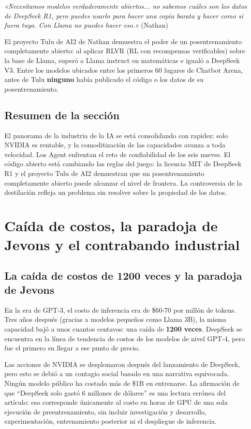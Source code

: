 \documentclass[a4paper]{article}
\begin{document}
\textit{«Necesitamos modelos verdaderamente abiertos... no sabemos cuáles son los datos de DeepSeek R1, pero puedes usarlo para hacer una copia barata y hacer como si fuera tuya. Con Llama no puedes hacer eso.»} (Nathan)

El proyecto Tulu de AI2 de Nathan demuestra el poder de un posentrenamiento completamente abierto: al aplicar RLVR (RL con recompensas verificables) sobre la base de Llama, superó a Llama instruct en matemáticas e igualó a DeepSeek V3. Entre los modelos ubicados entre los primeros 60 lugares de Chatbot Arena, antes de Tulu \textbf{ninguno} había publicado el código o los datos de su posentrenamiento.

\subsection{Resumen de la sección}

El panorama de la industria de la IA se está consolidando con rapidez: solo NVIDIA es rentable, y la comoditización de las capacidades avanza a toda velocidad. Los Agent enfrentan el reto de confiabilidad de los seis nueves. El código abierto está cambiando las reglas del juego: la licencia MIT de DeepSeek R1 y el proyecto Tulu de AI2 demuestran que un posentrenamiento completamente abierto puede alcanzar el nivel de frontera. La controversia de la destilación refleja un problema sin resolver sobre la propiedad de los datos.
\section{Caída de costos, la paradoja de Jevons y el contrabando industrial}

\subsection{La caída de costos de 1200 veces y la paradoja de Jevons}

En la era de GPT-3, el costo de inferencia era de \$60-70 por millón de tokens. Tres años después (gracias a modelos pequeños como Llama 3B), la misma capacidad bajó a unos cuantos centavos: una caída de \textbf{1200 veces}. DeepSeek se encuentra en la línea de tendencia de costos de los modelos de nivel GPT-4, pero fue el primero en llegar a ese punto de precio.

Las acciones de NVIDIA se desplomaron después del lanzamiento de DeepSeek, pero esto se debió a un contagio social basado en una narrativa equivocada. Ningún modelo público ha costado más de \$1B en entrenarse. La afirmación de que ``DeepSeek solo gastó 6 millones de dólares'' es una lectura errónea del artículo: eso corresponde únicamente al costo en horas de GPU de una sola ejecución de preentrenamiento, sin incluir investigación y desarrollo, experimentación, entrenamiento posterior ni el despliegue de inferencia.
\end{document}

